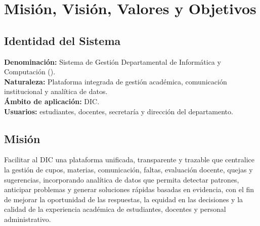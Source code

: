 \chapter{Misión, Visión, Valores y Objetivos}
\label{ch:mision-vision}

\section{Identidad del Sistema}

\begin{cajaNota}[Identidad]
\textbf{Denominación:} Sistema de Gestión Departamental de Informática y
Computación (\sistema).\\[4pt]
\textbf{Naturaleza:} Plataforma integrada de gestión académica, comunicación
institucional y analítica de datos.\\[4pt]
\textbf{Ámbito de aplicación:} \ac{DIC}.\\[4pt]
\textbf{Usuarios:} estudiantes, docentes, secretaría y dirección del departamento.
\end{cajaNota}

\section{Misión}

\begin{cajaObjetivo}[Misión]
Facilitar al \ac{DIC} una plataforma unificada, transparente y trazable que
centralice la gestión de cupos, materias, comunicación, faltas, evaluación
docente, quejas y sugerencias, incorporando analítica de datos que permita
detectar patrones, anticipar problemas y generar soluciones rápidas basadas en
evidencia, con el fin de mejorar la oportunidad de las respuestas, la equidad en
las decisiones y la calidad de la experiencia académica de estudiantes, docentes
y personal administrativo.
\end{cajaObjetivo}


